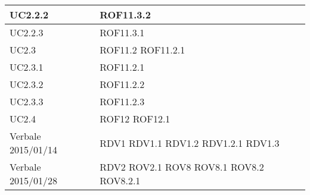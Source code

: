 \begin{center}
\begin{longtable}{| p{4cm} | p{4cm} |}
\hline
UC2.2.2 & ROF11.3.2 \\
\hline
UC2.2.3 & ROF11.3.1 \\
\hline
UC2.3 & ROF11.2 \newline ROF11.2.1 \\
\hline
UC2.3.1 & ROF11.2.1 \\
\hline
UC2.3.2 & ROF11.2.2 \\
\hline
UC2.3.3 & ROF11.2.3 \\
\hline
UC2.4 & ROF12 \newline ROF12.1 \\
\hline
Verbale 2015/01/14 & RDV1 \newline RDV1.1 \newline RDV1.2 \newline RDV1.2.1 \newline RDV1.3 \\
\hline
Verbale 2015/01/28 & RDV2 \newline ROV2.1 \newline ROV8 \newline ROV8.1 \newline ROV8.2 \newline ROV8.2.1 \\
\hline
\end{longtable}
\egroup
\end{center}
